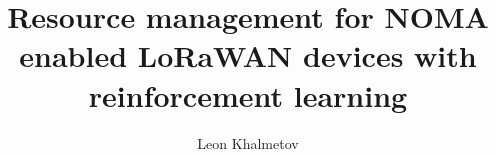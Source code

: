 \documentclass[a4paper, twoside]{report}
\title{Resource management for NOMA enabled LoRaWAN devices with reinforcement learning}
\author{Leon Khalmetov}
\begin{document}



\renewcommand{\abstractname}{Acknowledgements}
\begin{abstract}
\end{abstract}

\tableofcontents









\end{document}
